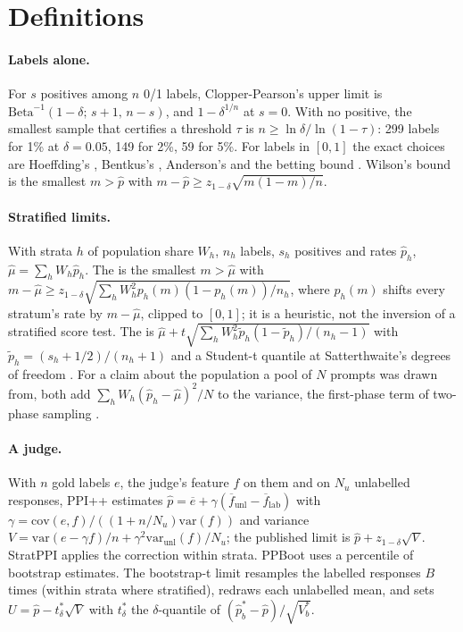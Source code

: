
\section{Definitions}
\label{app:defs}

\paragraph{Labels alone.} For $s$ positives among $n$ 0/1 labels, Clopper-Pearson's upper limit is
$\mathrm{Beta}^{-1}(1-\delta;\,s+1,\,n-s)$, and $1-\delta^{1/n}$ at $s=0$. With no positive, the smallest sample that
certifies a threshold $\tau$ is $n\ge\ln\delta/\ln(1-\tau)$: 299 labels for 1\% at $\delta=0.05$, 149 for 2\%, 59 for
5\%. For labels in $[0,1]$ the exact choices are Hoeffding's \citep{hoeffding1963}, Bentkus's \citep{bentkus2004},
Anderson's \citep{learnedmiller2019} and the betting bound \citep{waudbysmith2024betting}. Wilson's bound
\citep{wilson1927} is the smallest $m>\hat p$ with $m-\hat p\ge z_{1-\delta}\sqrt{m(1-m)/n}$.

\paragraph{Stratified limits.} With strata $h$ of population share $W_h$, $n_h$ labels, $s_h$ positives and rates
$\hat p_h$, $\hat\mu=\sum_hW_h\hat p_h$. The \SWL{} is the smallest $m>\hat\mu$ with
$m-\hat\mu\ge z_{1-\delta}\sqrt{\sum_hW_h^2p_h(m)(1-p_h(m))/n_h}$, where $p_h(m)$ shifts every stratum's rate by
$m-\hat\mu$, clipped to $[0,1]$; it is a heuristic, not the inversion of a stratified score test. The \SWT{} is
$\hat\mu+t\sqrt{\sum_hW_h^2\tilde p_h(1-\tilde p_h)/(n_h-1)}$ with $\tilde p_h=(s_h+1/2)/(n_h+1)$ and a Student-t
quantile at Satterthwaite's degrees of freedom \citep{satterthwaite1946}. For a claim about the population a pool of $N$
prompts was drawn from, both add $\sum_hW_h(\hat p_h-\hat\mu)^2/N$ to the variance, the first-phase term of two-phase
sampling \citep{neyman1938,cochran1977}.

\paragraph{A judge.} With $n$ gold labels $e$, the judge's feature $f$ on them and on $N_u$ unlabelled responses, PPI++
\citep{angelopoulos2023ppipp} estimates $\hat p=\overline{e}+\gamma(\overline{f}_{\text{unl}}-\overline{f}_{\text{lab}})$ with
$\gamma=\mathrm{cov}(e,f)/((1+n/N_u)\mathrm{var}(f))$ and variance $V=\mathrm{var}(e-\gamma f)/n+\gamma^2\mathrm{var}_{\text{unl}}(f)/N_u$;
the published limit is $\hat p+z_{1-\delta}\sqrt V$. StratPPI \citep{fisch2024stratppi} applies the correction within
strata. PPBoot \citep{zrnic2024ppboot} uses a percentile of bootstrap estimates. The bootstrap-t limit
\citep{hall1988} resamples the labelled responses $B$ times (within strata where stratified), redraws each unlabelled
mean, and sets $U=\hat p-t^*_\delta\sqrt V$ with $t^*_\delta$ the $\delta$-quantile of $(\hat p^*_b-\hat p)/\sqrt{V^*_b}$.


